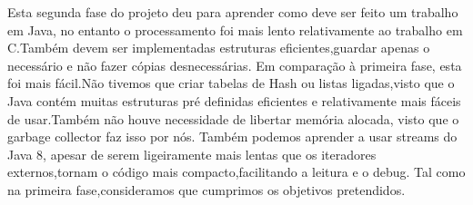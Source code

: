 Esta segunda fase do projeto deu para aprender como deve ser feito um trabalho em Java, no entanto o processamento foi mais lento relativamente ao trabalho em C.Também devem ser implementadas estruturas eficientes,guardar apenas o necessário e não fazer cópias desnecessárias.
\newline
Em comparação à primeira fase, esta foi mais fácil.Não tivemos que criar tabelas de Hash ou listas ligadas,visto que o Java contém muitas estruturas pré definidas eficientes e relativamente mais fáceis de usar.Também não houve necessidade de libertar memória alocada, visto que o garbage collector faz isso por nós.
\newline
Também podemos aprender a usar streams do Java 8, apesar de serem ligeiramente mais lentas que os iteradores externos,tornam o código mais compacto,facilitando a leitura e o debug.
\newline
Tal como na primeira fase,consideramos que cumprimos os objetivos pretendidos.












\addtolength{\textheight}{-12cm}   %








